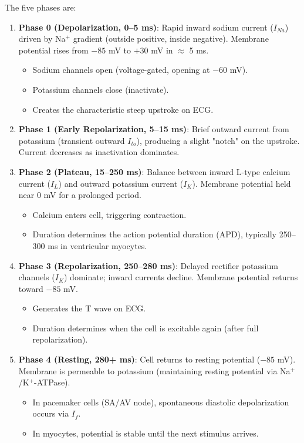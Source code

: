 \documentclass[12pt,oneside,a4paper]{book}
\begin{document}
The five phases are:

\begin{enumerate}
  \item \textbf{Phase 0 (Depolarization, 0--5 ms)}: Rapid inward sodium current ($I_{Na}$) driven by Na$^+$ gradient (outside positive, inside negative). Membrane potential rises from $-85$ mV to $+30$ mV in $\approx$ 5 ms.
    \begin{itemize}
      \item Sodium channels open (voltage-gated, opening at $-60$ mV).
      \item Potassium channels close (inactivate).
      \item Creates the characteristic steep upstroke on ECG.
    \end{itemize}

  \item \textbf{Phase 1 (Early Repolarization, 5--15 ms)}: Brief outward current from potassium (transient outward $I_{to}$), producing a slight "notch" on the upstroke. Current decreases as inactivation dominates.

  \item \textbf{Phase 2 (Plateau, 15--250 ms)}: Balance between inward L-type calcium current ($I_L$) and outward potassium current ($I_K$). Membrane potential held near 0 mV for a prolonged period.
    \begin{itemize}
      \item Calcium enters cell, triggering contraction.
      \item Duration determines the action potential duration (APD), typically 250--300 ms in ventricular myocytes.
    \end{itemize}

  \item \textbf{Phase 3 (Repolarization, 250--280 ms)}: Delayed rectifier potassium channels ($I_K$) dominate; inward currents decline. Membrane potential returns toward $-85$ mV.
    \begin{itemize}
      \item Generates the T wave on ECG.
      \item Duration determines when the cell is excitable again (after full repolarization).
    \end{itemize}

  \item \textbf{Phase 4 (Resting, 280+ ms)}: Cell returns to resting potential ($-85$ mV). Membrane is permeable to potassium (maintaining resting potential via Na$^+$/K$^+$-ATPase).
    \begin{itemize}
      \item In pacemaker cells (SA/AV node), spontaneous diastolic depolarization occurs via $I_f$.
      \item In myocytes, potential is stable until the next stimulus arrives.
    \end{itemize}
\end{enumerate}
\end{document}
